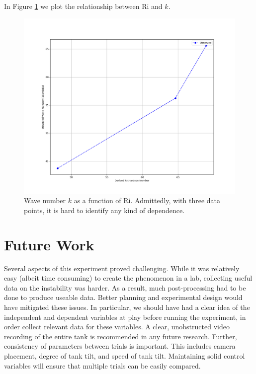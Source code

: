 \documentclass{article}
\begin{document}
In Figure \ref{graph:Ri-vs-k} we plot the relationship between Ri and \(k\).

\begin{figure}[h!]
    \centering
    \includegraphics[width=5in]{RivsK.png}
    \caption{Wave number $k$ as a function of Ri. Admittedly, with three data points, it is hard to identify any kind of dependence.}
    \label{graph:Ri-vs-k}
\end{figure}

\section{Future Work}

Several aspects of this experiment proved challenging. While it was relatively
easy (albeit time consuming) to create the phenomenon in a lab, collecting
useful data on the instability was harder. As a result, much post-processing had
to be done to produce useable data. Better planning and experimental design
would have mitigated these issues. In particular, we should have had a clear
idea of the independent and dependent variables at play before running the
experiment, in order collect relevant data for these variables. A clear,
unobstructed video recording of the entire tank is recommended in any future
research. Further, consistency of parameters between trials is important. This
includes camera placement, degree of tank tilt, and speed of tank tilt.
Maintaining solid control variables will ensure that multiple trials can be
easily compared.

\newpage
{}

\end{document}
